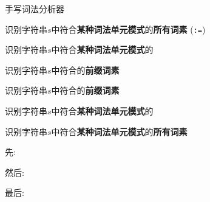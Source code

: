
\begin{frame}{}

  \begin{center}
    手写词法分析器
  \end{center}
\end{frame}

\begin{frame}{}
  \begin{center}
    识别字符串$s$中符合{\bf 某种词法单元模式}的{\bf 所有词素}
    \ws \quad \ifkw \quad \elsekw \quad \id \quad \blue{\intnum \quad \floatnum \quad \scinum}
    \quad \relop \quad \assign\; (\texttt{:=})

    \pause
    \vspace{0.80cm}
    识别字符串$s$中符合{\bf 某种词法单元模式}的

    \pause
    \vspace{0.80cm}
    识别字符串$s$中符合的{\bf 前缀词素}
  \end{center}
\end{frame}

\begin{frame}{}
  \begin{center}
    识别字符串$s$中符合的{\bf 前缀词素}

    \vspace{0.80cm}

    \vspace{0.80cm}
    识别字符串$s$中符合{\bf 某种词法单元模式}的

    \vspace{0.80cm}

    \vspace{0.80cm}
    识别字符串$s$中符合{\bf 某种词法单元模式}的{\bf 所有词素}
  \end{center}
\end{frame}

\begin{frame}{}
  \begin{center}
    先: \ws \quad \ifkw \quad \elsekw \quad \id \quad \intnum 

    \vspace{1.00cm}
    然后: \relop 
    
    \vspace{1.00cm}
    最后: \floatnum \quad \scinum

    \vspace{1.00cm}
  \end{center}
\end{frame}

